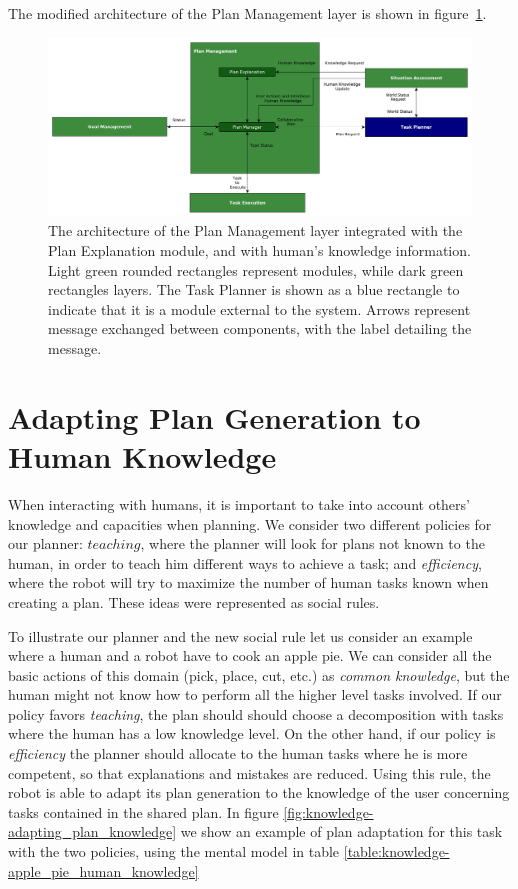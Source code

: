 The modified architecture of the Plan Management layer is shown in figure~\ref{fig:knowledge-knowledge_architecture}.

\afterpage{\clearpage}
\begin{figure}
  \centering
  \includegraphics[scale=0.5]{img/teacher/knowledge_architecture.pdf}
  \caption[Integration of the human knowledge in the Plan Management layer]{The architecture of the Plan Management layer integrated with the Plan Explanation module, and with human's knowledge information. Light green rounded rectangles represent modules, while dark green rectangles layers. The Task Planner is shown as a blue rectangle to indicate that it is a module external to the system. Arrows represent message exchanged between components, with the label detailing the message.}
  \label{fig:knowledge-knowledge_architecture}
\end{figure}


\section{Adapting Plan Generation to Human Knowledge}
\label{sec:knowledge-adapting_knowledge}
When interacting with humans, it is important to take into account others' knowledge and capacities when planning. We consider two different policies for our planner: $teaching$, where the planner will look for plans not known to the human, in order to teach him different ways to achieve a task; and \textit{efficiency}, where the robot will try to maximize the number of human tasks known when creating a plan. These ideas were represented as social rules.

To illustrate our planner and the new social rule let us consider an example where a human and a robot have to cook an apple pie. We can consider all the basic actions of this domain (pick, place, cut, etc.) as \textit{common knowledge}, but the human might not know how to perform all the higher level tasks involved. If our policy favors \textit{teaching}, 
the plan should should choose a decomposition with tasks where the human has a low knowledge level. On the other hand, if our policy is \textit{efficiency} the planner should allocate to the human tasks where he is more competent, so that explanations and mistakes are reduced. Using this rule, the robot is able to adapt its plan generation to the knowledge of the user concerning tasks contained in the shared plan. In figure \ref{fig:knowledge-adapting_plan_knowledge} we show an example of plan adaptation for this task with the two policies, using the mental model in table \ref{table:knowledge-apple_pie_human_knowledge}

